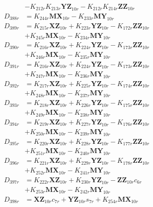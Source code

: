 \begin{multicols}{2}
\begin{align}
&- K_{212r}K_{213r}\mathbf{YZ}_{10r} - K_{212r}K_{214r}\mathbf{ZZ}_{10r} \nonumber \\
D_{388r} &= K_{244r}\mathbf{MX}_{10r} - K_{233r}\mathbf{MY}_{10r} \nonumber \\
D_{389r} &= K_{215r}\mathbf{XZ}_{10r} + K_{223r}\mathbf{YZ}_{10r} - K_{172r}\mathbf{ZZ}_{10r}  \nonumber \\
&+ K_{245r}\mathbf{MX}_{10r} - K_{234r}\mathbf{MY}_{10r} \nonumber \\
D_{390r} &= K_{216r}\mathbf{XZ}_{10r} + K_{224r}\mathbf{YZ}_{10r} - K_{173r}\mathbf{ZZ}_{10r}  \nonumber \\
&+ K_{246r}\mathbf{MX}_{10r} - K_{235r}\mathbf{MY}_{10r} \nonumber \\
D_{391r} &= K_{216r}\mathbf{XZ}_{10r} + K_{224r}\mathbf{YZ}_{10r} - K_{173r}\mathbf{ZZ}_{10r}  \nonumber \\
&+ K_{247r}\mathbf{MX}_{10r} - K_{236r}\mathbf{MY}_{10r} \nonumber \\
D_{392r} &= K_{217r}\mathbf{XZ}_{10r} + K_{225r}\mathbf{YZ}_{10r} - K_{174r}\mathbf{ZZ}_{10r}  \nonumber \\
&+ K_{248r}\mathbf{MX}_{10r} - K_{237r}\mathbf{MY}_{10r} \nonumber \\
D_{393r} &= K_{218r}\mathbf{XZ}_{10r} + K_{226r}\mathbf{YZ}_{10r} - K_{175r}\mathbf{ZZ}_{10r}  \nonumber \\
&+ K_{249r}\mathbf{MX}_{10r} - K_{238r}\mathbf{MY}_{10r} \nonumber \\
D_{394r} &= K_{219r}\mathbf{XZ}_{10r} + K_{227r}\mathbf{YZ}_{10r} - K_{176r}\mathbf{ZZ}_{10r}  \nonumber \\
&+ K_{250r}\mathbf{MX}_{10r} - K_{239r}\mathbf{MY}_{10r} \nonumber \\
D_{395r} &= K_{220r}\mathbf{XZ}_{10r} + K_{228r}\mathbf{YZ}_{10r} - K_{177r}\mathbf{ZZ}_{10r}  \nonumber \\
&+ K_{251r}\mathbf{MX}_{10r} - K_{240r}\mathbf{MY}_{10r} \nonumber \\
D_{396r} &= K_{221r}\mathbf{XZ}_{10r} + K_{229r}\mathbf{YZ}_{10r} - K_{178r}\mathbf{ZZ}_{10r}  \nonumber \\
&+ K_{252r}\mathbf{MX}_{10r} - K_{241r}\mathbf{MY}_{10r} \nonumber \\
D_{397r} &= K_{222r}\mathbf{XZ}_{10r} + K_{230r}\mathbf{YZ}_{10r} - \mathbf{ZZ}_{10r}c_{6r}  \nonumber \\
&+ K_{253r}\mathbf{MX}_{10r} - K_{242r}\mathbf{MY}_{10r} \nonumber \\
D_{398r} &= \mathbf{XZ}_{10r}c_{7r} + \mathbf{YZ}_{10r}s_{7r} + K_{254r}\mathbf{MX}_{10r}  \nonumber \\

\end{align}
\end{multicols}
